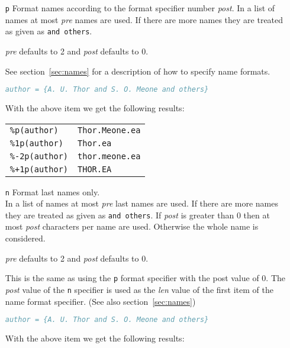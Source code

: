 \documentclass[11pt,a4paper]{scrbook}
\begin{document}
\begin{itemize}
  \item [\texttt{p}] Format names according to the format
    specifier number \textit{post}. In a list of names at most \textit{pre}
    names are used. If there are more names they are treated as given as
    \texttt{and others}.

    \textit{pre} defaults to 2 and \textit{post} defaults to 0.

    See section~\ref{sec:names} for a description of how to specify name
    formats.

    \begin{Example}
      \begin{lstlisting}[language=BibTeX]
  author = {A. U. Thor and S. O. Meone and others}
      \end{lstlisting}\vspace{-2ex}
      With the above item we get the following results:

      \begin{tabular}{ll}
        \texttt{\%p(author)}	& \texttt{Thor.Meone.ea}	\\
        \texttt{\%1p(author)}	& \texttt{Thor.ea}		\\
        \texttt{\%-2p(author)}	& \texttt{thor.meone.ea}	\\
        \texttt{\%+1p(author)}	& \texttt{THOR.EA}		
      \end{tabular}
    \end{Example}

  \item [\texttt{n}] Format last names only.\\
    In a list of names at most \textit{pre} last names are used. If there are
    more names they are treated as given as \texttt{and others}. If
    \textit{post} is greater than 0 then at most \textit{post} characters per
    name are used. Otherwise the whole name is considered.

    \textit{pre} defaults to 2 and \textit{post} defaults to 0.

    This is the same as using the \texttt{p} format specifier with the post
    value of 0. The \textit{post} value of the \texttt{n} specifier is used as
    the \textit{len} value of the first item of the name format specifier.
    (See also section~\ref{sec:names})

    \begin{Example}
      \begin{lstlisting}[language=BibTeX]
  author = {A. U. Thor and S. O. Meone and others}
      \end{lstlisting}\vspace{-2ex}
      With the above item we get the following results:


\end{Example}
\end{itemize}
\end{document}
